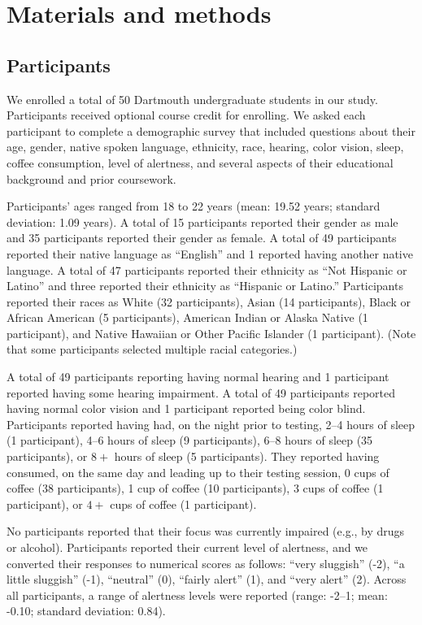 \documentclass[10pt]{article}
\begin{document}
\section*{Materials and methods}

\subsection*{Participants}

We enrolled a total of 50 Dartmouth undergraduate students in our study.
Participants received optional course credit for enrolling. We asked each
participant to complete a demographic survey that included questions about
their age, gender, native spoken language, ethnicity, race, hearing, color
vision, sleep, coffee consumption, level of alertness, and several aspects of
their educational background and prior coursework.

Participants' ages ranged from 18 to 22 years (mean: 19.52 years; standard
deviation: 1.09 years). A total of 15 participants reported their gender as
male and 35 participants reported their gender as female. A total of 49
participants reported their native language as ``English'' and 1 reported
having another native language. A total of 47 participants reported their
ethnicity as ``Not Hispanic or Latino'' and three reported their ethnicity as
``Hispanic or Latino.'' Participants reported their races as White (32
participants), Asian (14 participants), Black or African American (5
participants), American Indian or Alaska Native (1 participant), and Native
Hawaiian or Other Pacific Islander (1 participant). (Note that some
participants selected multiple racial categories.)

A total of 49 participants reporting having normal hearing and 1 participant
reported having some hearing impairment. A total of 49 participants reported
having normal color vision and 1 participant reported being color blind.
Participants reported having had, on the night prior to testing, 2--4 hours of
sleep (1 participant), 4--6 hours of sleep (9 participants), 6--8 hours of
sleep (35 participants), or $8+$ hours of sleep (5 participants). They reported
having consumed, on the same day and leading up to their testing session, 0
cups of coffee (38 participants), 1 cup of coffee (10 participants), 3 cups of
coffee (1 participant), or $4+$ cups of coffee (1 participant).

No participants reported that their focus was currently impaired (e.g., by
drugs or alcohol). Participants reported their current level of alertness, and
we converted their responses to numerical scores as follows: ``very sluggish''
(-2), ``a little sluggish'' (-1), ``neutral'' (0), ``fairly alert'' (1), and
``very alert'' (2). Across all participants, a range of alertness levels were
reported (range: -2--1; mean: -0.10; standard deviation: 0.84).
\end{document}
